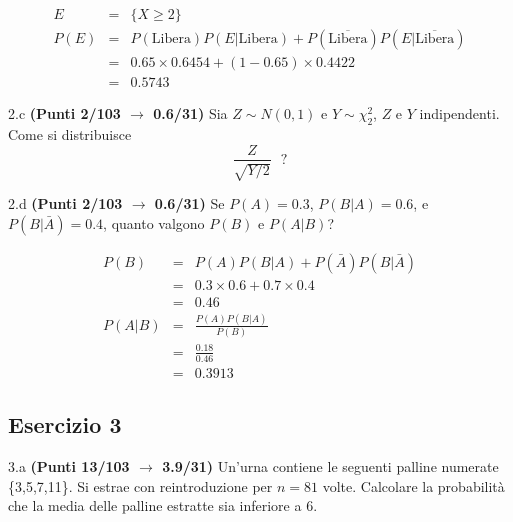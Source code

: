 \documentclass[
  11pt,
]{book}
\theoremstyle{mytheoremstyle}
\theoremstyle{mydefstyle}
\newenvironment{sol}
  {
  \begin{tcolorbox}[enhanced,breakable,arc=0.1mm,boxrule=1pt,colback=white,colframe=iblue,
  title=\bf \fontfamily{lmss}\selectfont \hspace{.5 cm} Soluzione,drop fuzzy shadow]

}{
\end{tcolorbox}
  }
\begin{document}
\begin{sol}
\begin{eqnarray*}
E &=& \{X\ge 2\}\\
P(E) &=& P(\text{Libera})P(E|\text{Libera})+P\left(\overline{\text{Libera}}\right)P\left(E|\overline{\text{Libera}}\right)\\
   &=&  0.65\times0.6454+(1-0.65)\times 0.4422\\
  &=& 0.5743
\end{eqnarray*}

\end{sol}

2.c \textbf{(Punti 2/103 \(\rightarrow\) 0.6/31)} Sia \(Z\sim N(0,1)\) e \(Y\sim \chi^2_2\), \(Z\) e \(Y\) indipendenti.
Come si distribuisce
\[
\frac{Z}{\sqrt{Y/2}} ~~~?
\]

2.d \textbf{(Punti 2/103 \(\rightarrow\) 0.6/31)} Se \(P(A)=0.3\), \(P(B|A)=0.6\), e \(P(B|\bar A)=0.4\), quanto valgono \(P(B)\) e \(P(A|B)\)?

\begin{sol}
\begin{eqnarray*}
P(B) &=& P(A)P(B|A)+P(\bar A)P(B|\bar A)\\
     &=& 0.3\times0.6+0.7\times 0.4\\
     &=& 0.46\\
P(A|B) &=& \frac {P(A)P(B|A)}{P(B)}\\
       &=& \frac {0.18}{0.46}\\
       &=& 0.3913
\end{eqnarray*}

\end{sol}

\subsection{Esercizio 3}\label{esercizio-3-30}

3.a \textbf{(Punti 13/103 \(\rightarrow\) 3.9/31)} Un'urna contiene le seguenti palline numerate \{3,5,7,11\}. Si estrae con reintroduzione per \(n=81\) volte.
Calcolare la probabilità che la media delle palline estratte sia inferiore a 6.
\end{document}
